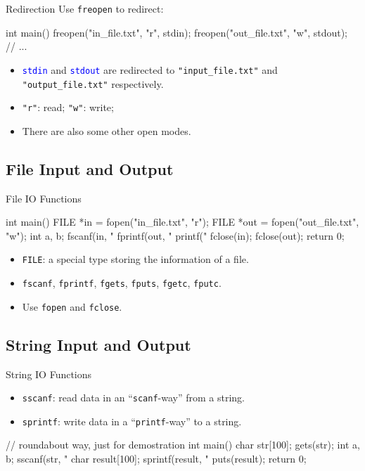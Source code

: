 \documentclass{beamer}
\newcommand{\blue}[1]{\textcolor{blue}{#1}}
\newcommand{\ttt}[1]{\texttt{#1}}
\newcommand{\bluett}[1]{\blue{\ttt{#1}}}
\theoremstyle{definition}
\begin{document}
\begin{frame}[fragile]{Redirection}
    Use \ttt{freopen} to redirect:
    \begin{cpp}
int main() {
  freopen("in_file.txt", "r", stdin);
  freopen("out_file.txt", "w", stdout);
  // ...
}
    \end{cpp}
    \pause
    \begin{itemize}
        \item \bluett{stdin} and \bluett{stdout} are redirected to \ttt{"input\_file.txt"} and \ttt{"output\_file.txt"} respectively.
        \item \ttt{"r"}: read; \ttt{"w"}: write;
        \item There are also some other open modes.
    \end{itemize}
\end{frame}

\subsection{File Input and Output}

\begin{frame}[fragile]{File IO Functions}
    \begin{cpp}
int main() {
  FILE *in = fopen("in_file.txt", "r");
  FILE *out = fopen("out_file.txt", "w");
  int a, b;
  fscanf(in, "%
  fprintf(out, "%
  printf("%
  fclose(in);
  fclose(out);
  return 0;
}
    \end{cpp}
    \begin{itemize}
        \item \ttt{FILE}: a special type storing the information of a file.
        \item \ttt{fscanf}, \ttt{fprintf}, \ttt{fgets}, \ttt{fputs}, \ttt{fgetc}, \ttt{fputc}.
        \item Use \ttt{fopen} and \ttt{fclose}.
    \end{itemize}
\end{frame}

\subsection{String Input and Output}

\begin{frame}[fragile]{String IO Functions}
    \begin{itemize}
        \item \ttt{sscanf}: read data in an ``\ttt{scanf}-way'' from a string.
        \item \ttt{sprintf}: write data in a ``\ttt{printf}-way'' to a string.
    \end{itemize}
    \begin{cpp}
// roundabout way, just for demostration
int main() {
  char str[100];
  gets(str);
  int a, b;
  sscanf(str, "%
  char result[100];
  sprintf(result, "%
  puts(result);
  return 0;
}
    \end{cpp}
\end{frame}
\end{document}
